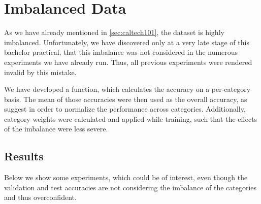 \documentclass[a4paper, 11pt]{article}
\begin{document}
\clearpage


\appendix
\section{Imbalanced Data} \label{app:imbalance}
As we have already mentioned in \cref{sec:caltech101}, the dataset is highly imbalanced.
Unfortunately, we have discovered only at a very late stage of this bachelor practical, that this imbalance was not considered in the numerous experiments we have already run.
Thus, all previous experiments were rendered invalid by this mistake.

We have developed a function, which calculates the accuracy on a per-category basis.
The mean of those accuracies were then used as the overall accuracy, as \citet{Fei-Fei2007} suggest in order to normalize the performance across categories.
Additionally, category weights were calculated and applied while training, such that the effects of the imbalance were less severe.


\subsection{Results}
Below we show some experiments, which could be of interest, even though the validation and test accuracies are not considering the imbalance of the categories and thus overconfident.
\end{document}
